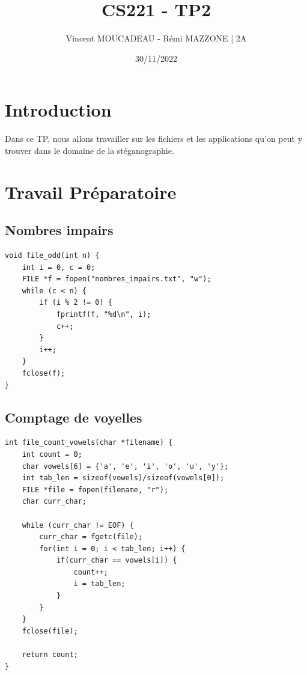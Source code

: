 \documentclass[12pt]{article}
\title{CS221 - TP2}
\author{Vincent MOUCADEAU - Rémi MAZZONE | 2A}
\date{30/11/2022}
\begin{document}
\maketitle

\tableofcontents
\lstlistoflistings

\newpage

\section{Introduction}
Dans ce TP, nous allons travailler sur les fichiers et les applications qu'on peut y trouver dans le domaine de la stéganographie.

\section{Travail Préparatoire}

\subsection{Nombres impairs}
\begin{lstlisting}[style=languageC, caption=Code pour avoir les 100 premiers nombres impairs]
void file_odd(int n) {
    int i = 0, c = 0;
    FILE *f = fopen("nombres_impairs.txt", "w");
    while (c < n) {
        if (i % 2 != 0) {
            fprintf(f, "%d\n", i);
            c++;
        }
        i++;
    }
    fclose(f);
}
\end{lstlisting}

\subsection{Comptage de voyelles}
\begin{lstlisting}[style=languageC, caption=Code pour compter le nombre de voyelles dans un fichier texte]
int file_count_vowels(char *filename) {
    int count = 0;
    char vowels[6] = {'a', 'e', 'i', 'o', 'u', 'y'};
    int tab_len = sizeof(vowels)/sizeof(vowels[0]);
    FILE *file = fopen(filename, "r");
    char curr_char;

    while (curr_char != EOF) {
        curr_char = fgetc(file);
        for(int i = 0; i < tab_len; i++) {
            if(curr_char == vowels[i]) {
                count++;
                i = tab_len;
            }
        }
    }
    fclose(file);    

    return count;
}
\end{lstlisting}
\end{document}
